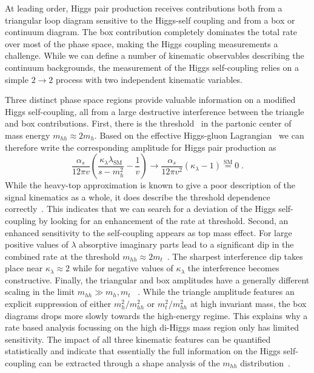 At leading order, Higgs pair production receives contributions both 
from a triangular loop diagram sensitive to the Higgs-self coupling 
and from a box or continuum diagram. The box contribution completely 
dominates the total rate over most of the phase space, making the Higgs 
coupling measurements a challenge. While we can define a number of
kinematic observables describing the continuum backgrounds, the
measurement of the Higgs self-coupling relies on a simple $2 \to 2$
process with two independent kinematic variables.

Three distinct phase space regions provide valuable information on a
modified Higgs self-coupling, all from a large destructive interference 
between the triangle and box contributions. First, there is the 
threshold~\cite{hh-early,hh-ww} in the partonic center of mass energy 
$ m_{hh} \approx 2 m_h$. Based on the effective
Higgs-gluon Lagrangian~\cite{low_energy} we can therefore write the
corresponding amplitude for Higgs pair production as
%
\begin{equation}
\frac{\alpha_s}{12 \pi v}
\left( \frac{\kappa_\lambda \lambda_\text{SM}}{s-m_h^2} - \frac{1}{v} \right) 
\to
\frac{\alpha_s}{12 \pi v^2}
\left( \kappa_\lambda -1 \right) \stackrel{\text{SM}}{=} 0 \; .
\label{eq:higgs_pair}
\end{equation}
%
While the heavy-top approximation is known to give a poor description
of the signal kinematics as a whole, it does describe the threshold
dependence correctly~\cite{hh-ww}. 
This indicates that we can search
for a deviation of the Higgs self-coupling by looking for an
enhancement of the rate at threshold. 
Second, an enhanced sensitivity to the self-coupling appears as top
mass effect. For large positive values of $\lambda$ absorptive imaginary 
parts lead to a significant dip in the combined rate at the threshold 
$m_{hh} \approx 2 m_t $~\cite{hh-tautau, madmax-hh}. 
The sharpest interference dip takes place near $\kappa_\lambda\approx 2$
while for negative values of $\kappa_\lambda$ the interference 
becomes constructive.
Finally, the triangular and box amplitudes have a generally different
scaling in the limit $m_{hh} \gg m_h, m_t$
~\cite{hh-early,hh-tautau}. While the triangle amplitude features an 
explicit suppression of either $m_h^2/m_{hh}^2$ or 
$m_t^2/m_{hh}^2$ at high invariant mass, the box diagrams drops 
more slowly towards the high-energy regime. This explains why a 
rate based analysis focussing on the high di-Higgs mass region
only has limited sensitivity. The impact of all three kinematic features can be quantified
statistically and  indicate that essentially the full
information on the Higgs self-coupling can be extracted through a
shape analysis of the $m_{hh}$ distribution~\cite{martin}. 

